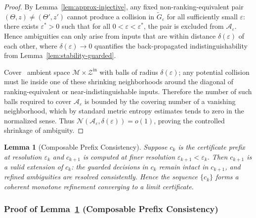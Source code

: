 \documentclass[12pt]{article}
\theoremstyle{definition}
\theoremstyle{plain}
\newtheorem{lemma}{Lemma}[section]
\begin{document}
\begin{proof}
By Lemma~\ref{lem:approx-injective}, any fixed non-ranking-equivalent pair \((\Theta,z)\neq(\Theta',z')\) cannot produce a collision in \(\tilde G_\varepsilon\) for all sufficiently small \(\varepsilon\): there exists \(\varepsilon^*>0\) such that for all \(0<\varepsilon<\varepsilon^*\), the pair is excluded from \(\mathcal A_\varepsilon\). Hence ambiguities can only arise from inputs that are within distance \(\delta(\varepsilon)\) of each other, where \(\delta(\varepsilon)\to0\) quantifies the back-propagated indistinguishability from Lemma~\ref{lem:stability-guarded}.

Cover \ ambient space \(\mathcal M\times\mathcal Z^{\mathrm{in}}\) with balls of radius \(\delta(\varepsilon)\); any potential collision must lie inside one of these shrinking neighborhoods around the diagonal of ranking-equivalent or near-indistinguishable inputs. Therefore the number of such balls required to cover \(\mathcal A_\varepsilon\) is bounded by the covering number of a vanishing neighborhood, which by standard metric entropy estimates tends to zero in the normalized sense. Thus \(\mathcal N(\mathcal A_\varepsilon,\delta(\varepsilon))=o(1)\), proving the controlled shrinkage of ambiguity.
\end{proof}



\begin{lemma}[Composable Prefix Consistency]
\label{lem:prefix-consistency}
Suppose \(c_k\) is the certificate prefix at resolution \(\varepsilon_k\) and \(c_{k+1}\) is computed at finer resolution \(\varepsilon_{k+1}<\varepsilon_k\). Then \(c_{k+1}\) is a valid extension of \(c_k\): the guarded decisions in \(c_k\) remain intact in \(c_{k+1}\), and refined ambiguities are resolved consistently. Hence the sequence \(\{c_k\}\) forms a coherent monotone refinement converging to a limit certificate.
\end{lemma}

\subsubsection*{Proof of Lemma~\ref{lem:prefix-consistency} (Composable Prefix Consistency)}
\label{proof:prefix-consistency}
\end{document}
